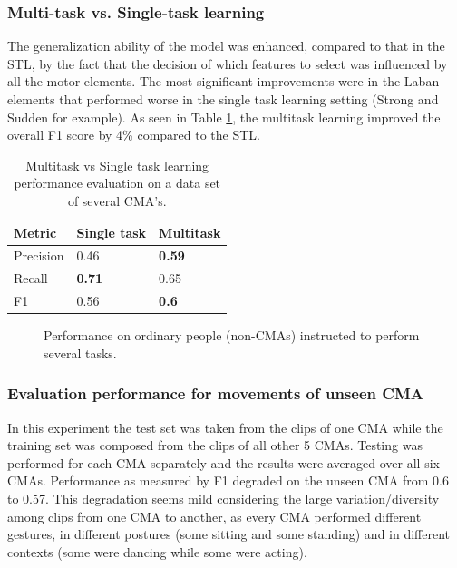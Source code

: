 \subsubsection{Multi-task vs. Single-task learning}
The generalization ability of the model was enhanced, compared to that in the
STL, by the fact that the decision of which features to select was influenced by
all the motor elements. The most significant improvements were in the Laban
elements that performed worse in the single task learning setting (Strong and
Sudden for example). As seen in Table \ref{MultitaskVsSeparated}, the multitask
learning improved the overall F1 score  by 4\% compared to the STL.
\begin{table}[ht]
\caption{Multitask vs Single task learning performance evaluation on a data set of several CMA's.}
   \label{MultitaskVsSeparated}
  	\centering
	\begin{tabular}{|p{1.8cm}|p{1.8cm}|p{1.8cm}|}
	\hline
	Metric&Single task&Multitask\\\hline
	Precision&0.46&\textbf{0.59}\\\hline
	Recall&\textbf{0.71}&0.65\\\hline
	F1&0.56&\textbf{0.6}\\\hline
	\end{tabular}
	
\end{table}

\begin{figure}
\centering
{}
\caption{Performance on ordinary  people (non-CMAs) instructed to perform several tasks.}
\label{nonCMAs}
\end{figure}

\subsubsection{Evaluation performance for movements of unseen CMA}
In this experiment the test set was taken from the clips of one CMA while the
training set was composed from the clips of all other 5 CMAs. Testing was
performed for each CMA separately and the results were averaged over all six
CMAs. Performance as measured by F1 degraded on the unseen CMA from 0.6 to 0.57.
This degradation seems mild considering the large variation/diversity among
clips from one CMA to another, as every CMA performed different gestures, in
different postures (some sitting and some standing) and in different contexts
(some were dancing while some were acting).
